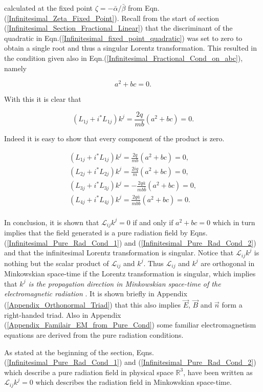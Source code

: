 \noindent calculated at the fixed point $\zeta = - \bar{\alpha} / {\bar{\beta}}$ from Eqn.(\ref{Infinitesimal_Zeta_Fixed_Point}). Recall from the start of section (\ref{Infinitesimal_Section_Fractional_Linear}) that the discriminant of the quadratic in Eqn.(\ref{Infinitesimal_fixed_point_quadratic}) was set to zero to obtain a single root and thus a singular Lorentz transformation. This resulted in the condition given also in Eqn.(\ref{Infinitesimal_Fractional_Cond_on_abc}), namely

\begin{equation*}   
a^2 + bc = 0.
\end{equation*}

\noindent With this it is clear that 

$$(L_{1j} + i ^*L_{1j}) k^j  = \frac{2q}{mb} (a^2 + bc) = 0.$$

\noindent Indeed it is easy to show that every component of the product is zero.

\begin{gather*}
(L_{1j} + i ^*L_{1j}) k^j  = \frac{2q}{mb} (a^2 + bc) = 0, \\
(L_{2j} + i ^*L_{2j}) k^j  = \frac{2iq}{m} (a^2 + bc) = 0, \\
(L_{3j} + i ^*L_{3j}) k^j  = -\frac{2q\bar{a}}{mb\bar{b}} (a^2 + bc) = 0, \\
(L_{4j} + i ^*L_{4j}) k^j  = \frac{2q\bar{a}}{mb\bar{b}} (a^2 + bc) = 0. \\
\end{gather*}

In conclusion, it is shown that $\mathcal{L}_{ij} k^j = 0$ if and only if $a^2 + bc = 0$ which in turn implies that the field generated is a pure radiation field by Eqns.(\ref{Infinitesimal_Pure_Rad_Cond_1}) and (\ref{Infinitesimal_Pure_Rad_Cond_2}) and that the infinitesimal Lorentz transformation is singular. Notice that $\mathcal{L}_{ij} k^j$ is nothing but the scalar product of $\mathcal{L}_{ij}$ and $k^j$. Thus $\mathcal{L}_{ij}$ and $k^j$ are orthogonal in Minkowskian space-time if the Lorentz transformation is singular, which implies that \textit{$k^j$ is the propagation direction in Minkowskian space-time of the electromagnetic radiation} \cite[p. 328]{Relativity_Synge}. It is shown briefly in Appendix (\ref{Appendix_Orthonormal_Triad}) that this also implies $\vec{E}$, $\vec{B}$ and $\vec{n}$ form a right-handed triad. Also in Appendix (\ref{Appendix_Familair_EM_from_Pure_Cond}) some familiar electromagnetism equations are derived from the pure radiation conditions.   

As stated at the beginning of the section, Eqns.(\ref{Infinitesimal_Pure_Rad_Cond_1}) and (\ref{Infinitesimal_Pure_Rad_Cond_2}) which describe a pure radiation field in physical space $\mathbb{R}^3$, have been written as $\mathcal{L}_{ij} k^j = 0$ which describes the radiation field in Minkowskian space-time.
   




  










